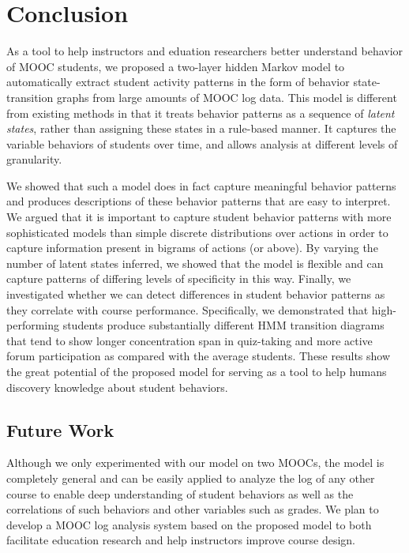 \section{Conclusion}
As a tool to help instructors and eduation researchers better understand behavior of MOOC students, 
 we proposed a two-layer hidden Markov model to automatically extract 
student activity patterns in the form of behavior state-transition graphs from large amounts of 
MOOC log data. This model is different from existing
methods in that it treats behavior patterns as a sequence of \emph{latent
states}, rather than assigning these states in a rule-based manner. It
captures the variable behaviors of students over time, and allows
analysis at different levels of granularity.

We showed that such a model does in fact capture meaningful behavior
patterns and produces descriptions of these behavior patterns that are easy
to interpret. We argued that it is important to capture student behavior
patterns with more sophisticated models than simple discrete distributions
over actions in order to capture information present in bigrams of actions
(or above). By varying the number of latent
states inferred, we showed that the model is flexible and can capture
patterns of differing levels of specificity in this way.  Finally, we
investigated whether we can detect differences in student behavior patterns
as they correlate with course performance. Specifically, we demonstrated
that high-performing students produce substantially different HMM
transition diagrams that tend to show longer concentration span in quiz-taking
and more active  forum participation as compared with the average students.
These results show the great potential of the proposed model for serving as a tool
to help humans discovery knowledge about student behaviors.  

\subsection{Future Work}

Although we only experimented with our model on two MOOCs, the model is
completely general and can be easily applied to analyze the log of any
other course to enable deep understanding of student behaviors as well as
the correlations of such behaviors and other variables such as grades. We
plan to develop a MOOC log analysis system based on the proposed model to
both facilitate education research and help instructors improve course
design.

